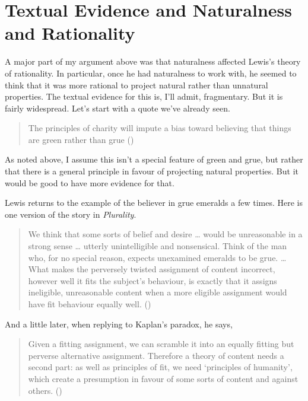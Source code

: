 \documentclass[
  10pt,
  letterpaper,
  DIV=11,
  numbers=noendperiod,
  twoside]{scrartcl}
\begin{document}
\section{Textual Evidence and Naturalness and
Rationality}\label{textual-evidence-and-naturalness-and-rationality}

A major part of my argument above was that naturalness affected Lewis's
theory of rationality. In particular, once he had naturalness to work
with, he seemed to think that it was more rational to project natural
rather than unnatural properties. The textual evidence for this is, I'll
admit, fragmentary. But it is fairly widespread. Let's start with a
quote we've already seen.

\begin{quote}
The principles of charity will impute a bias toward believing that
things are green rather than grue ()
\end{quote}

As noted above, I assume this isn't a special feature of green and grue,
but rather that there is a general principle in favour of projecting
natural properties. But it would be good to have more evidence for that.

Lewis returns to the example of the believer in grue emeralds a few
times. Here is one version of the story in \emph{Plurality}.

\begin{quote}
We think that some sorts of belief and desire \ldots{} would be
unreasonable in a strong sense \ldots{} utterly unintelligible and
nonsensical. Think of the man who, for no special reason, expects
unexamined emeralds to be grue. \ldots{} What makes the perversely
twisted assignment of content incorrect, however well it fits the
subject's behaviour, is exactly that it assigns ineligible, unreasonable
content when a more eligible assignment would have fit behaviour equally
well. ()
\end{quote}

And a little later, when replying to Kaplan's paradox, he says,

\begin{quote}
Given a fitting assignment, we can scramble it into an equally fitting
but perverse alternative assignment. Therefore a theory of content needs
a second part: as well as principles of fit, we need `principles of
humanity', which create a presumption in favour of some sorts of content
and against others. ()
\end{quote}
\end{document}
